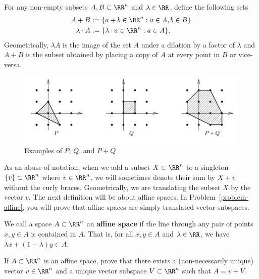 \documentclass[11pt]{article}
\begin{document}
\begin{defn}
    For any non-empty subsets $A, B \subset \RR^n$ and $\lambda \in \RR$, define the following sets
    \begin{align*}
        A + B & := \{a + b \in \RR^n : a \in A, b \in B\} \\
        \lambda \cdot A & := \{\lambda \cdot a \in \RR^n : a \in A \}.
    \end{align*}
    Geometrically, $\lambda A$ is the image of the set $A$ under a dilation by a factor of $\lambda$ and $A + B$ is the subset obtained by placing a copy of $A$ at every point in $B$ or vice-versa.
\end{defn}
\begin{figure}[h]
    \begin{center}
        \includegraphics[scale = 0.7]{../images/image1.png}
        \caption{Examples of $P$, $Q$, and $P+Q$}
    \end{center}
\end{figure}

As an abuse of notation, when we add a subset $X \subset \RR^n$ to a singleton $\{v\} \subset \RR^n$ where $v \in \RR^n$, we will sometimes denote their sum by $X + v$ without the curly braces. Geometrically, we are translating the subset $X$ by the vector $v$. The next definition will be about affine spaces. In Problem~\ref{problem-affine}, you will prove that affine spaces are simply translated vector subspaces. 

\begin{defn}
    We call a space $A \subset \RR^n$ an \textbf{affine space} if the line through any pair of points $x, y \in A$ is contained in $A$. That is, for all $x, y \in A$ and $\lambda \in \RR$, we have $\lambda x + (1 - \lambda)y \in A$. 
\end{defn}

\begin{prob}[10 points]\label{problem-affine}
    If $A \subset \RR^n$ is an affine space, prove that there exists a (non-necessarily unique) vector $v \in \RR^n$ and a unique vector subspace $V \subset \RR^n$ such that $A = v + V$. 
\end{prob}
\end{document}

